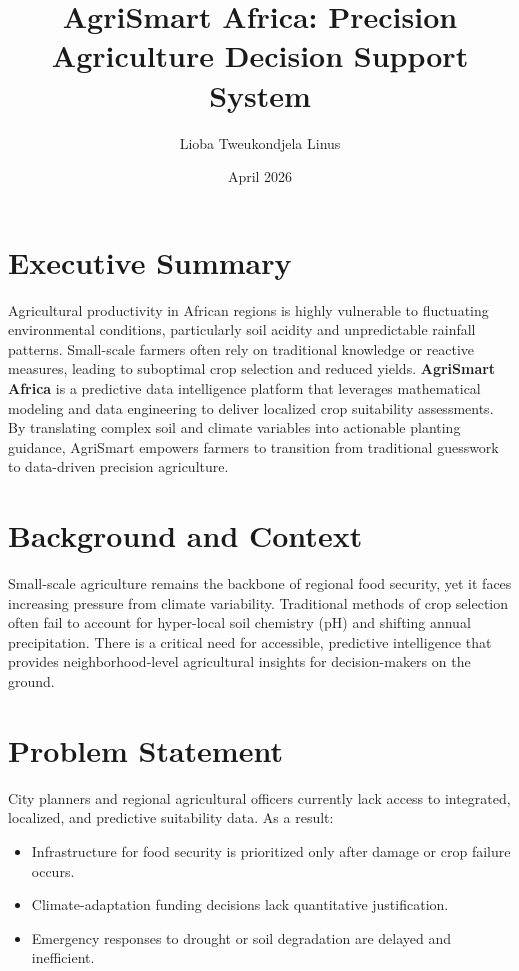 \documentclass[11pt]{article}
\title{\textbf{AgriSmart Africa: Precision Agriculture Decision Support System}}
\author{Lioba Tweukondjela Linus}
\date{April 2026}
\begin{document}
\maketitle

\section*{Executive Summary}
Agricultural productivity in African regions is highly vulnerable to fluctuating environmental conditions, particularly soil acidity and unpredictable rainfall patterns. Small-scale farmers often rely on traditional knowledge or reactive measures, leading to suboptimal crop selection and reduced yields. \textbf{AgriSmart Africa} is a predictive data intelligence platform that leverages mathematical modeling and data engineering to deliver localized crop suitability assessments. By translating complex soil and climate variables into actionable planting guidance, AgriSmart empowers farmers to transition from traditional guesswork to data-driven precision agriculture.

\section{Background and Context}
Small-scale agriculture remains the backbone of regional food security, yet it faces increasing pressure from climate variability. Traditional methods of crop selection often fail to account for hyper-local soil chemistry (pH) and shifting annual precipitation. There is a critical need for accessible, predictive intelligence that provides neighborhood-level agricultural insights for decision-makers on the ground.

\section{Problem Statement}
City planners and regional agricultural officers currently lack access to integrated, localized, and predictive suitability data. As a result:
\begin{itemize}[noitemsep]
    \item Infrastructure for food security is prioritized only after damage or crop failure occurs.
    \item Climate-adaptation funding decisions lack quantitative justification.
    \item Emergency responses to drought or soil degradation are delayed and inefficient.
\end{itemize}
\end{document}
